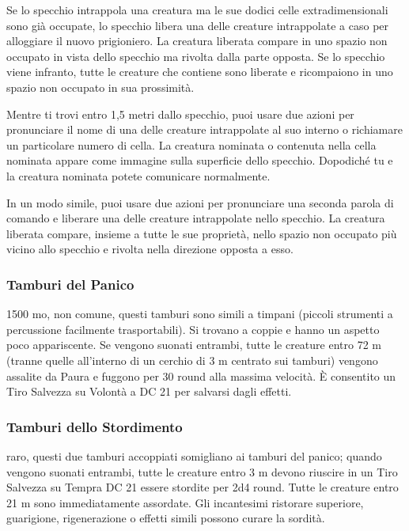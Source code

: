 \begin{multicols}{2}
	Se lo specchio intrappola una creatura ma le sue dodici celle extradimensionali sono già occupate, lo specchio libera una delle creature intrappolate a caso per alloggiare il nuovo prigioniero. La creatura liberata compare in uno spazio non occupato in vista dello specchio ma rivolta dalla parte opposta. Se lo specchio viene infranto, tutte le creature che contiene sono liberate e ricompaiono in uno spazio non occupato in sua prossimità.

	Mentre ti trovi entro 1,5 metri dallo specchio, puoi usare due azioni per pronunciare il nome di una delle creature intrappolate al suo interno o richiamare un particolare numero di cella. La creatura nominata o contenuta nella cella nominata appare come immagine sulla superficie dello specchio. Dopodiché tu e la creatura nominata potete comunicare normalmente.

	In un modo simile, puoi usare due azioni per pronunciare una seconda parola di comando e liberare una delle creature intrappolate nello specchio. La creatura liberata compare, insieme a tutte le sue proprietà, nello spazio non occupato più vicino allo specchio e rivolta nella direzione opposta a esso.

	\subsubsection*{Tamburi del Panico}
	1500 mo, non comune, questi tamburi sono simili a timpani (piccoli strumenti a percussione facilmente trasportabili). Si trovano a coppie e hanno un aspetto poco appariscente. Se vengono suonati entrambi, tutte le creature entro 72 m (tranne quelle all’interno di un cerchio di 3 m centrato sui tamburi) vengono assalite da Paura e fuggono per 30 round alla massima velocità. È consentito un Tiro Salvezza su Volontà a DC 21 per salvarsi dagli effetti.

	\subsubsection*{Tamburi dello Stordimento}
	raro, questi due tamburi accoppiati somigliano ai tamburi del panico; quando vengono suonati entrambi, tutte le creature entro 3 m devono riuscire in un Tiro Salvezza su Tempra DC 21 essere stordite per 2d4 round. Tutte le creature entro 21 m sono immediatamente assordate. Gli incantesimi ristorare superiore, guarigione, rigenerazione o effetti simili possono curare la sordità.


\end{multicols}
